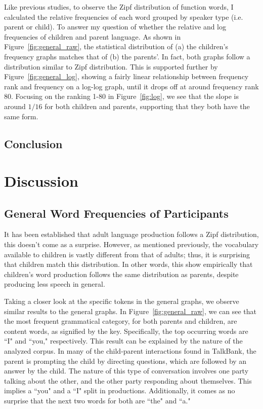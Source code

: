 \documentclass{article}
\theoremstyle{plain}
\theoremstyle{definition}
\theoremstyle{remark}
\numberwithin{equation}{section}
\begin{document}
Like previous studies, to observe the Zipf distribution of function words, I calculated the relative frequencies of each word grouped by speaker type (i.e. parent or child). 
To answer my question of whether the relative and log frequencies of children and parent language. As shown in Figure~\ref{fig:general_raw}, the statistical distribution of (a) the children's frequency graphs matches that of (b) the parents'. In fact, both graphs follow a distribution similar to Zipf distribution. This is supported further by Figure~\ref{fig:general_log}, showing a fairly linear relationship between frequency rank and frequency on a log-log graph, until it drops off at around frequency rank 80. Focusing on the ranking 1-80 in Figure~\ref{fig:log}, we see that the slope is around $1/16$ for both children and parents, supporting that they both have the same form.
\subsection{Conclusion}

\section{Discussion}

\subsection{General Word Frequencies of Participants}
It has been established that adult language production follows a Zipf distribution, this doesn't come as a surprise. However, as mentioned previously, the vocabulary available to children is vastly different from that of adults; thus, it is surprising that children match this distribution. In other words, this show empirically that children's word production follows the same distribution as parents, despite producing less speech in general. 

Taking a closer look at the specific tokens in the general graphs, we observe similar results to the general graphs. In Figure~\ref{fig:general_raw}, we can see that the most frequent grammatical category, for both parents and children, are content words, as signified by the key. Specifically, the top occurring words are ``I" and ``you," respectively. This result can be explained by the nature of the analyzed corpus. In many of the child-parent interactions found in TalkBank, the parent is prompting the child by directing questions, which are followed by an answer by the child. The nature of this type of conversation involves one party talking about the other, and the other party responding about themselves. This implies a ``you" and a ``I" split in productions. Additionally, it comes as no surprise that the next two words for both are ``the" and ``a." 
\end{document}
